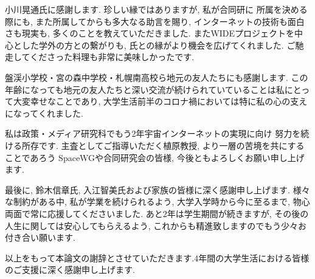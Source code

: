 小川晃通氏に感謝します. 珍しい縁ではありますが, 私が合同研に
所属を決める際にも, また所属してからも多大なる助言を賜り, インターネットの技術も面白さも現実も, 
多くのことを教えていただきました. またWIDEプロジェクトを中心とした学外の方との繋がりも, 
氏との縁がより機会を広げてくれました. ご馳走してくださった料理も非常に美味しかったです.

盤渓小学校・宮の森中学校・札幌南高校ら地元の友人たちにも感謝します. 
この年齢になっても地元の友人たちと深い交流が続けられていていることは私にとって大変幸せなことであり, 
大学生活前半のコロナ禍においては特に私の心の支えになってくれました.

私は政策・メディア研究科でもう2年宇宙インターネットの実現に向け
努力を続ける所存です. 主査としてご指導いただく植原教授, より一層の苦境を共にすることであろう
SpaceWGや合同研究会の皆様, 今後ともよろしくお願い申し上げます. 

最後に, 鈴木信章氏, 入江智美氏および家族の皆様に深く感謝申し上げます. 様々な制約がある中, 
私が学業を続けられるよう, 大学入学時から今に至るまで, 物心両面で常に応援してくださいました. あと2年は学生期間が続きますが, 
その後の人生に関しては安心してもらえるよう, これからも精進致しますのでもう少々お付き合い願います. 

以上をもって本論文の謝辞とさせていただきます.4年間の大学生活における皆様のご支援に深く感謝申し上げます.



